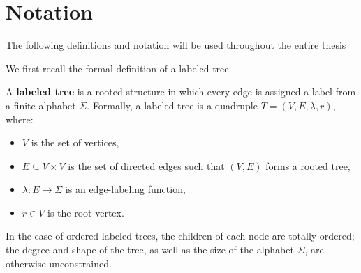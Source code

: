\section{Notation} \label{sec:notation}
The following definitions and notation will be used throughout the entire thesis

We first recall the formal definition of a labeled tree.

\begin{definition} \label{def:labeled_tree}
    A \textbf{labeled tree} is a rooted structure in which every edge is assigned a label from a finite alphabet $\Sigma$. Formally, a labeled tree is a quadruple $T = (V, E, \lambda, r)$, where:
    \begin{itemize}
        \item $V$ is the set of vertices,
        \item $E \subseteq V \times V$ is the set of directed edges such that $(V,E)$ forms a rooted tree,
        \item $\lambda : E \to \Sigma$ is an edge-labeling function,
        \item $r \in V$ is the root vertex.
    \end{itemize}
\end{definition}

In the case of ordered labeled trees, the children of each node are totally ordered; the degree and shape of the tree, as well as the size of the alphabet $\Sigma$, are otherwise unconstrained.

